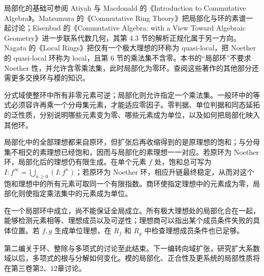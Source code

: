 \ProseParagraphBreak
局部化的基础可参阅 Atiyah 与 Macdonald 的《Introduction to Commutative Algebra》\cite[Chapter 3]{AtiyahMacdonald1969CommutativeAlgebra}。Matsumura 的《Commutative Ring Theory》\cite[Section 4]{Matsumura1989CommutativeRingTheory}把局部化与环的素谱一起讨论；Eisenbud 的《Commutative Algebra: with a View Toward Algebraic Geometry》\cite[Sections 1.2, 1.4, 1.6, 2.1, 4.1--4.2, 4.4--4.5]{Eisenbud1995CommutativeAlgebra}进一步联系代数几何，其第 4.3 节的解析正规化属于另一方向\cite[Section 4.3]{Eisenbud1995CommutativeAlgebra}。Nagata 的《Local Rings》\cite[Sections 5--6]{Nagata1975LocalRings}把仅有一个极大理想的环称为 quasi-local，把 Noether 的 quasi-local 环称为 local，且第 6 节的乘法集不含零。本书的“局部环”不要求 Noether 性，并允许含零乘法集，此时局部化为零环。查阅这些著作的其他部分还需更多交换环与模的知识。






\begin{chaptersummary}
	分式域使整环中所有非零元素可逆；局部化则允许指定一个乘法集。一般环中的等式必须容许再乘一个分母集元素，才能适应零因子。零判据、单位判据和同态延拓的泛性质，分别说明哪些元素变为零、哪些元素成为单位，以及如何把局部化映入其他环。

	\ProseParagraphBreak
	局部化中的全部理想都来自原环，但扩张后再收缩得到的是原理想的饱和；与分母集不相交的素理想已经饱和，因而与局部化的素理想一一对应。若原环为 Noether 环，局部化后的理想仍有限生成。在单个元素 \(f\) 处，饱和总可写为 \(I:f^\infty=\bigcup_{n\geq0}(I:f^n)\)；若原环为 Noether 环，相应升链最终稳定，从而对这个饱和理想中的所有元素可取同一个有限指数。商环使指定理想中的元素成为零，局部化则使指定乘法集中的元素成为单位。

	\ProseParagraphBreak
	在一个局部环中成立，尚不能保证全局成立。所有极大理想处的局部化合在一起，能够检测元素相等、理想成员以及可逆性；理想商可以指出某个成员条件失败的具体位置。若 \(f,g\) 生成单位理想，在 \(R_f\) 和 \(R_g\) 中检查理想成员条件也已足够。

	\ProseParagraphBreak
	第二编关于环、整除与多项式的讨论至此结束。下一编转向域扩张，研究扩大系数域以后，多项式的根与分解如何变化。模的局部化、正合性及更系统的局部性质将在第三卷第2、12章讨论。
\end{chaptersummary}

\BookExercises

